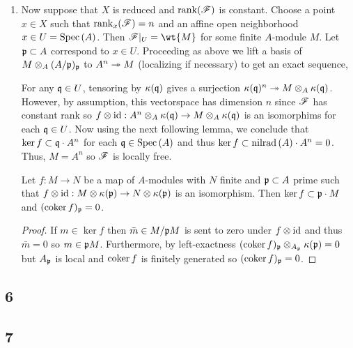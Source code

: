 \documentclass[12pt]{article}
\begin{document}
\begin{enumerate}
\item Now suppose that $X$ is reduced and $\mathrm{rank}(\mathscr{F})$ is constant. Choose a point $x \in X$ such that $\mathrm{rank}_x(\mathscr{F}) = n$ and an affine open neighborhood $x \in U = \mathrm{Spec}\left( A \right)$. Then $\F|_U = \wt{M}$ for some finite $A$-module $M$. Let $\mathfrak{p} \subset A$ correspond to $x \in U$. Proceeding as above we lift a basis of $M \otimes_A (A/\mathfrak{p})_{\mathfrak{p}}$ to $A^n \twoheadrightarrow M$ (localizing if necessary) to get an exact sequence,
\begin{center}
\end{center}
For any $\mathfrak{q} \in U$, tensoring by $\kappa(\mathfrak{q})$ gives a surjection $\kappa(\mathfrak{q})^n \twoheadrightarrow M \otimes_{A} \kappa(\mathfrak{q})$. However, by assumption, this vectorspace has dimension $n$ since $\mathscr{F}$ has constant rank so $f \otimes \mathrm{id} : A^n \otimes_{A} \kappa(\mathfrak{q}) \to M \otimes_{A} \kappa(\mathfrak{q})$ is an isomorphims for each $\mathfrak{q} \in U$. 
Now using the next following lemma, we conclude that $\ker{f} \subset \mathfrak{q} \cdot A^n$ for each $\mathfrak{q} \in \mathrm{Spec}\left( A \right)$ and thus $\ker{f} \subset \mathrm{nilrad}\left( A \right) \cdot A^n = 0$. Thus, $M = A^n$ so $\mathscr{F}$ is locally free.

\begin{lemma}
Let $f : M \to N$ be a map of $A$-modules with $N$ finite and $\mathfrak{p} \subset A$ prime such that $f \otimes \mathrm{id} : M \otimes \kappa(\mathfrak{p}) \to N \otimes \kappa(\mathfrak{p})$ is an isomorphism. Then $\ker{f} \subset \mathfrak{p} \cdot M$ and $(\operatorname{\mathrm{coker}}{f})_{\mathfrak{p}} = 0$.
\end{lemma}

\begin{proof}
If $m \in \ker{f}$ then $\bar{m} \in M/\mathfrak{p} M$ is sent to zero under $f \otimes \mathrm{id}$ and thus $\bar{m} = 0$ so $m \in \mathfrak{p} M$. Furthermore, by left-exactness $(\operatorname{\mathrm{coker}}{f})_{\mathfrak{p}} \otimes_{A_{\mathfrak{p}}} \kappa(\mathfrak{p}) = 0$ but $A_{\mathfrak{p}}$ is local and $\operatorname{\mathrm{coker}}{f}$ is finitely generated so $(\operatorname{\mathrm{coker}}{f})_{\mathfrak{p}} = 0$. 
\end{proof}

\end{enumerate}

\subsection{6}

\subsection{7}
\end{document}
